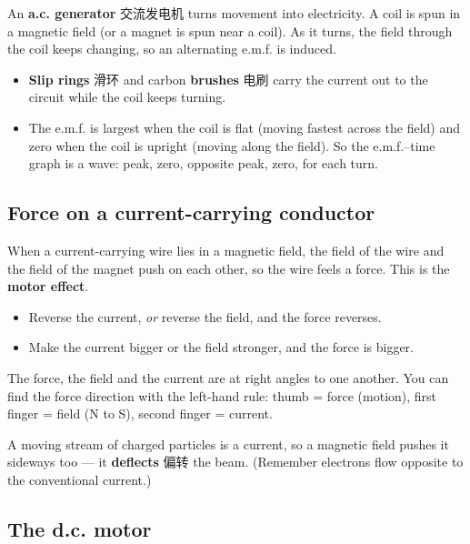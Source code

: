 \documentclass[11pt]{article}
\begin{document}
An \textbf{a.c. generator} 交流发电机 turns movement into electricity. A coil is spun in a magnetic field (or a magnet is spun near a coil). As it turns, the field through the coil keeps changing, so an alternating e.m.f. is induced.

\begin{itemize}
\item \textbf{Slip rings} 滑环 and carbon \textbf{brushes} 电刷 carry the current out to the circuit while the coil keeps turning.

\item The e.m.f. is largest when the coil is flat (moving fastest across the field) and zero when the coil is upright (moving along the field). So the e.m.f.–time graph is a wave: peak, zero, opposite peak, zero, for each turn.

\end{itemize}

\subsection*{Force on a current-carrying conductor}

When a current-carrying wire lies in a magnetic field, the field of the wire and the field of the magnet push on each other, so the wire feels a force. This is the \textbf{motor effect}.

\begin{itemize}
\item Reverse the current, \emph{or} reverse the field, and the force reverses.

\item Make the current bigger or the field stronger, and the force is bigger.

\end{itemize}

The force, the field and the current are at right angles to one another. You can find the force direction with the left-hand rule: thumb = force (motion), first finger = field (N to S), second finger = current.

A moving stream of charged particles is a current, so a magnetic field pushes it sideways too — it \textbf{deflects} 偏转 the beam. (Remember electrons flow opposite to the conventional current.)

\subsection*{The d.c. motor}
\end{document}
